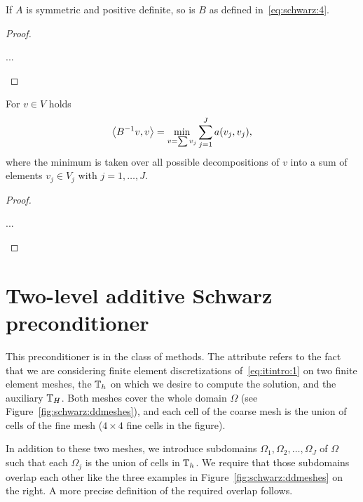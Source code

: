 \begin{lemma}
  If $A$ is symmetric and positive definite, so is $B$ as defined
  in~\eqref{eq:schwarz:4}.
\end{lemma}

\begin{proof}
  \begin{todo}
    ...
  \end{todo}
\end{proof}

\begin{lemma}
  For $v\in V$ holds
  \begin{gather}
    \label{eq:schwarz:5}
    \scal(B^{-1}v,v) = \min_{v=\sum v_j} \sum_{j=1}^J a(v_j,v_j),
  \end{gather}
  where the minimum is taken over all possible decompositions of $v$
  into a sum of elements $v_j\in V_j$ with $j=1,\dots,J$.
\end{lemma}

\begin{proof}
  \begin{todo}
    ...
  \end{todo}
\end{proof}

\section{Two-level additive Schwarz preconditioner}

\begin{intro}
  This preconditioner is in the class of  methods. The attribute  refers
  to the fact that we are considering finite element discretizations
  of~\eqref{eq:itintro:1} on two finite element meshes, the
   $\mathbb T_h$ on which we desire to compute the
  solution, and the auxiliary  $\mathbb T_H$. Both
  meshes cover the whole domain $\Omega$ (see
  Figure~\ref{fig:schwarz:ddmeshes}), and each cell of the coarse mesh
  is the union of cells of the fine mesh ($4\times 4$ fine cells in
  the figure).

  In addition to these two meshes, we introduce subdomains
  $\Omega_1,\Omega_2,\dots,\Omega_J$ of $\Omega$ such that each
  $\Omega_j$ is the union of cells in $\mathbb T_h$. We require that those
  subdomains overlap each other like the three examples in
  Figure~\ref{fig:schwarz:ddmeshes} on the right. A more precise
  definition of the required overlap follows.
\end{intro}

